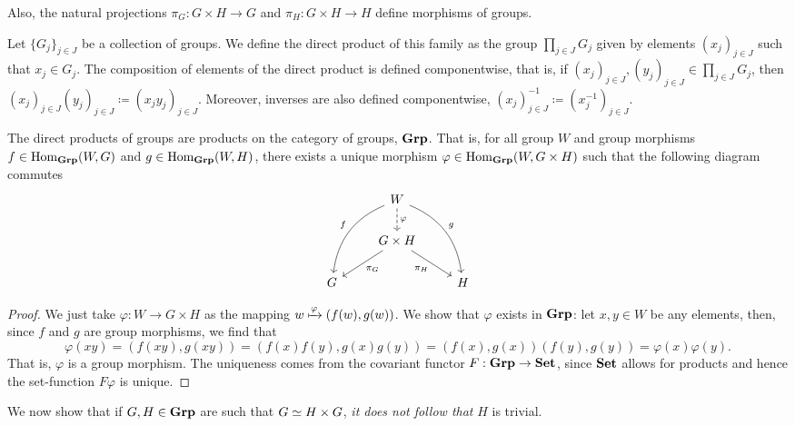 Also, the natural projections \(\pi_G: G \times H \to G\) and \(\pi_H: G \times
H \to H\) define morphisms of groups.

\begin{definition}
Let \(\{G_{j}\}_{j \in J}\) be a collection of groups. We define the direct
product of this family as the group \(\prod_{j \in J} G_j\) given by elements
\((x_j)_{j \in J}\) such that \(x_j \in G_j\). The composition of elements of
the direct product is defined componentwise, that is, if \((x_j)_{j \in J},
(y_j)_{j \in J} \in \prod_{j \in J} G_j\), then \((x_j)_{j \in J} (y_j)_{j \in
J} \coloneq (x_j y_j)_{j \in J}\). Moreover, inverses are also defined
componentwise, \((x_j)_{j \in J}^{-1} \coloneq (x_j^{-1})_{j \in J}\).
\end{definition}

\begin{proposition}
The direct products of groups are products on the category of groups,
\({\textbf{Grp}}\). That is, for all group \(W\) and group morphisms \(f \in
\operatorname{Hom}_{\textbf{Grp}}(W, G)\) and \(g \in \operatorname{Hom}_{\textbf{Grp}}(W, H)\), there exists a unique
morphism \(\varphi \in \operatorname{Hom}_{\textbf{Grp}}(W, G \times H)\) such that the following
diagram commutes
\[
  \begin{tikzcd}
    &W
    \ar[d, dashed, "\varphi"]
    \ar[ddr, bend left, "g"]
    \ar[ddl, swap, bend right, "f"]
    & \\
    &G \times H \ar[dr, swap, "\pi_H"] \ar[dl, "\pi_G"] & \\
    G & &H
  \end{tikzcd}
\]
\end{proposition}

\begin{proof}
We just take \(\varphi: W \to G \times H\) as the mapping \(w \xmapsto \varphi
(f(w), g(w))\). We show that \(\varphi\) exists in \({\textbf{Grp}}\): let \(x, y \in
W\) be any elements, then, since \(f\) and \(g\) are group morphisms, we find
that
\[
  \varphi(xy) = (f(xy), g(xy)) = (f(x) f(y), g(x) g(y))
  = (f(x), g(x)) (f(y), g(y)) = \varphi(x) \varphi(y).
\]
That is, \(\varphi\) is a group morphism. The uniqueness comes from the
covariant functor \(F: {\textbf{Grp}} \to {\textbf{Set}}\), since \({\textbf{Set}}\) allows for products and
hence the set-function \(F \varphi\) is unique.
\end{proof}

\begin{remark}
We now show that if \(G, H \in {\textbf{Grp}}\) are such that \(G \simeq H \times G\),
\emph{it does not follow that} \(H\) is trivial.
\end{remark}

